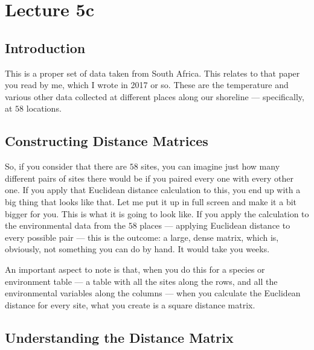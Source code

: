 \documentclass[
  12pt,
]{book}
\begin{document}
\chapter*{Lecture 5c}\label{lecture-5c}

\section{Introduction}\label{introduction-1}

This is a proper set of data taken from South Africa. This relates to
that paper you read by me, which I wrote in 2017 or so. These are the
temperature and various other data collected at different places along
our shoreline --- specifically, at \(58\) locations.

\section{Constructing Distance
Matrices}\label{constructing-distance-matrices}

So, if you consider that there are \(58\) sites, you can imagine just
how many different pairs of sites there would be if you paired every one
with every other one. If you apply that Euclidean distance calculation
to this, you end up with a big thing that looks like that. Let me put it
up in full screen and make it a bit bigger for you. This is what it is
going to look like. If you apply the calculation to the environmental
data from the \(58\) places --- applying Euclidean distance to every
possible pair --- this is the outcome: a large, dense matrix, which is,
obviously, not something you can do by hand. It would take you weeks.

An important aspect to note is that, when you do this for a species or
environment table --- a table with all the sites along the rows, and all
the environmental variables along the columns --- when you calculate the
Euclidean distance for every site, what you create is a square distance
matrix.

\section{Understanding the Distance
Matrix}\label{understanding-the-distance-matrix}
\end{document}
